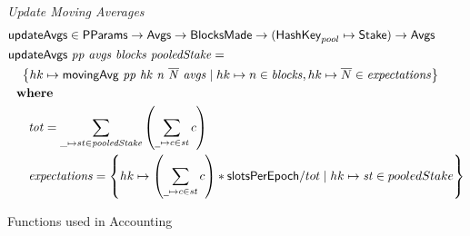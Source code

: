 \begin{figure}[htb]
  \emph{Update Moving Averages}
  \begin{align*}
      & \fun{updateAvgs} \in \PParams \to \Avgs \to \BlocksMade \to
          (\HashKey_{pool}\mapsto \Stake) \to \Avgs \\
      & \updateAvgs{pp}{avgs}{blocks}{pooledStake} = \\
      & ~~~ \left\{hk\mapsto \movingAvg{pp}{hk}{n}{\overline{N}}{avgs}
            \mid
            hk\mapsto n\in\var{blocks}, hk\mapsto\overline{N}\in\var{expectations}
            \right\} \\
      & \where \\
      & ~~~~~ \var{tot} = \sum_{\_\mapsto st\in \var{pooledStake}}
                          \left(\sum_{\wcard\mapsto c\in\var{st}}c\right) \\
      & ~~~~~ \var{expectations} =
                \left\{
                  hk\mapsto\left(\sum_{\wcard\mapsto c\in\var{st}}c\right)*\slotsPer / tot
                  \mid
                  hk\mapsto\var{st} \in pooledStake
                \right\}
  \end{align*}
  \caption{Functions used in Accounting}
  \label{fig:functions:epoch}
\end{figure}

